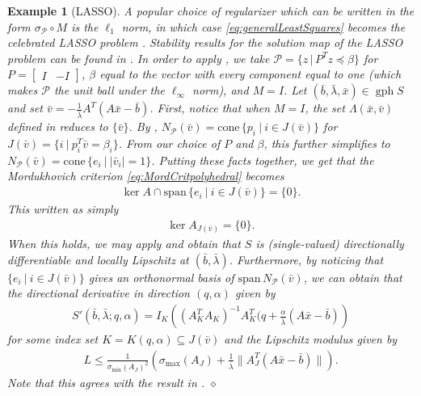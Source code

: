 \documentclass[reqno]{amsart}
\newtheorem{example}[proposition]{Example}
\numberwithin{equation}{section}
\newcommand{\pol}{\mathcal{P}}
\newcommand{\x}{\bar{x}}
\newcommand{\gph}{\operatorname{gph}}
\newcommand{\lin}{\mathrm{span}\,}
\newcommand{\cone}{\mathrm{cone}\,}
\begin{document}
\begin{example}[LASSO]
A popular choice of regularizer which can be written in the form $\sigma_{\pol} \circ M$ is the $\ell_1$ norm, in which case \eqref{eq:generalLeastSquares} becomes the celebrated LASSO problem \cite{T 96}. Stability results for the solution map of the LASSO problem can be found in \cite{BBH 22}. In order to apply , we take $\pol = \{z \, | \, P^Tz \preceq \beta \}$ for $P = \begin{bmatrix}
    I & -I
\end{bmatrix}$, $\beta$ equal to the vector with every component equal to one (which makes $\pol$ the unit ball under the $\ell_{\infty}$ norm), and $M = I$. Let $(\bar b, \bar \lambda, \bar x) \in \gph S$ and set $\bar v = -\frac{1}{\bar \lambda} A^T(A \bar x - \bar b)$. First, notice that when $M = I$, the set $\Lambda(\bar x, \bar v)$ defined in  reduces to $\{\bar v\}$. By \cite[Theorem 6.46]{RoW 98}, $N_{\pol}(\bar v) = \cone \{p_i \ | \ i \in J(\bar v)\}$ for $J(\bar v) = \{i \ | \ p_i^T\bar v = \beta_i\}$. From our choice of $P$ and $\beta$, this further simplifies to $N_{\pol}(\bar v) = \cone \{e_i \ | \ |\bar{v}_i| = 1\}$. Putting these facts together, we get that the Mordukhovich criterion \eqref{eq:MordCritpolyhedral} becomes \begin{align*}
    \ker A \cap \lin \{e_i \ | \ i \in J(\bar{v})\}=\{0\}.
\end{align*} This written as simply \begin{align*}
    \ker A_{J(\bar v)} = \{0\}.
\end{align*} When this holds, we may apply  and obtain that $S$ is (single-valued) directionally differentiable and locally Lipschitz at $(\bar b, \bar \lambda)$.
Furthermore, by noticing that $\{e_i \ | \ i \in J(\bar v) \}$ gives an orthonormal basis of $\lin N_{\pol}(\bar v)$, we can obtain that the directional derivative in direction $(q, \alpha)$ given by
\begin{align*}
  S'(\bar b, \bar \lambda ; q, \alpha) = I_K\left((A_K^TA_K)^{-1} A_K^T (q + \frac{\alpha}{\bar \lambda}(A \x - \bar b)\right)
\end{align*} for some index set $K = K(q, \alpha) \subseteq J(\bar v)$ and the Lipschitz modulus given by \begin{align*}
    L \le \frac{1}{\sigma_{\min}(A_J)^2} \left(\sigma_{\max}(A_J) + \frac{1}{\bar \lambda} \lVert A_J^T (A \bar x - \bar b) \rVert\right).
\end{align*} Note that this agrees with the result in \cite[Theorem 4.13(a)]{BBH 22}.
\hfill $\diamond$
\end{example}
\end{document}
